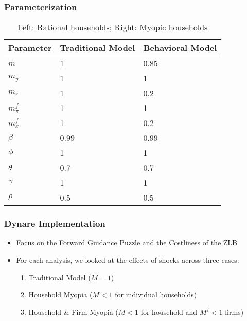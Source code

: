 \documentclass{beamer}
\begin{document}

\begin{frame}
	\frametitle{Parameterization}
\begin{table}
	\begin{tabular}{l l l}
		\toprule
		\textbf{Parameter} & \textbf{Traditional Model} & \textbf{Behavioral Model}\\
		\midrule
		$\bar{m}$ & 1 & 0.85 \\
		$m_{y}$ & 1 & 1 \\
		$m_{r}$ & 1 & 0.2\\
		$m^{f}_{\pi}$ & 1 & 1 \\
		$m^{f}_{x}$  & 1 & 0.2 \\
		\hline
		\hline
		$\beta$ & 0.99 & 0.99 \\
		$\phi$ & 1 & 1 \\
		$\theta$ & 0.7 & 0.7 \\
		$\gamma$ & 1 & 1 \\
		$\rho$	& 0.5 & 0.5\\
		\bottomrule
	\end{tabular}
	\caption{Left: Rational households; Right: Myopic households}
\end{table}
\end{frame}

\begin{frame}
	\frametitle{Dynare Implementation}
	\begin{itemize}
		\item Focus on the Forward Guidance Puzzle and the Costliness of the ZLB
		\vspace{8pt}
		\item For each analysis, we looked at the effects of shocks across three cases:
		\vspace{8pt}
		\begin{enumerate}
			\item Traditional Model ($M = 1$)
			\item Household Myopia ($M < 1$ for individual households)
			\item Household \& Firm Myopia ($M<1$ for household and $M^{f}<1$ firms)
		\end{enumerate}
	\end{itemize}
\end{frame}

\end{document}
